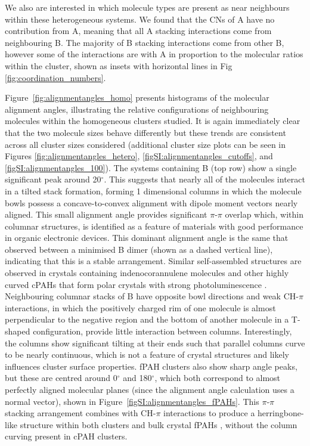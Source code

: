 We also are interested in which molecule types are present as near neighbours within these heterogeneous systems. We found that the CNs of A have no contribution from A, meaning that all A stacking interactions come from neighbouring B. The majority of B stacking interactions come from other B, however some of the interactions are with A in proportion to the molecular ratios within the cluster, shown as insets with horizontal lines in Fig \ref{fig:coordination_numbers}.

Figure~\ref{fig:alignmentangles_homo} presents histograms of the molecular alignment angles, illustrating the relative configurations of neighbouring molecules within the homogeneous clusters studied. It is again immediately clear that the two molecule sizes behave differently but these trends are consistent across all cluster sizes considered (additional cluster size plots can be seen in Figures \ref{fig:alignmentangles_hetero}, \ref{figSI:alignmentangles_cutoffs}, and \ref{figSI:alignmentangles_100}). The systems containing B (top row) show a single significant peak around 20$^{\circ}$.  This suggests that nearly all of the molecules interact in a tilted stack formation, forming 1 dimensional columns in which the molecule bowls possess a concave-to-convex alignment with dipole moment vectors nearly aligned. This small alignment angle provides significant $\pi$-$\pi$ overlap which, within columnar structures, is identified as a feature of materials with good performance in organic electronic devices. This dominant alignment angle is the same that observed between a minimised B dimer (shown as a dashed vertical line), indicating that this is a stable arrangement.  Similar self-assembled structures are observed in crystals containing indenocorannulene molecules \cite{Filatov2010} and other highly curved cPAHs that form polar crystals with strong photoluminescence \cite{chen2014highly}. Neighbouring columnar stacks of B have opposite bowl directions and weak CH-$\pi$ interactions, in which the positively charged rim of one molecule is almost perpendicular to the negative region and the bottom of another molecule in a T-shaped configuration, provide little interaction between columns. Interestingly, the columns show significant tilting at their ends such that parallel columns curve to be nearly continuous, which is not a feature of crystal structures and likely influences cluster surface properties. fPAH clusters also show sharp angle peaks, but these are centred around 0$^{\circ}$ and 180$^{\circ}$, which both correspond to almost perfectly aligned molecular planes (since the alignment angle calculation uses a normal vector), shown in Figure~\ref{figSI:alignmentangles_fPAHs}. This $\pi$-$\pi$ stacking arrangement combines with CH-$\pi$ interactions to produce a herringbone-like structure within both clusters and bulk crystal fPAHs \cite{Khanna200567}, without the column curving present in cPAH clusters.

